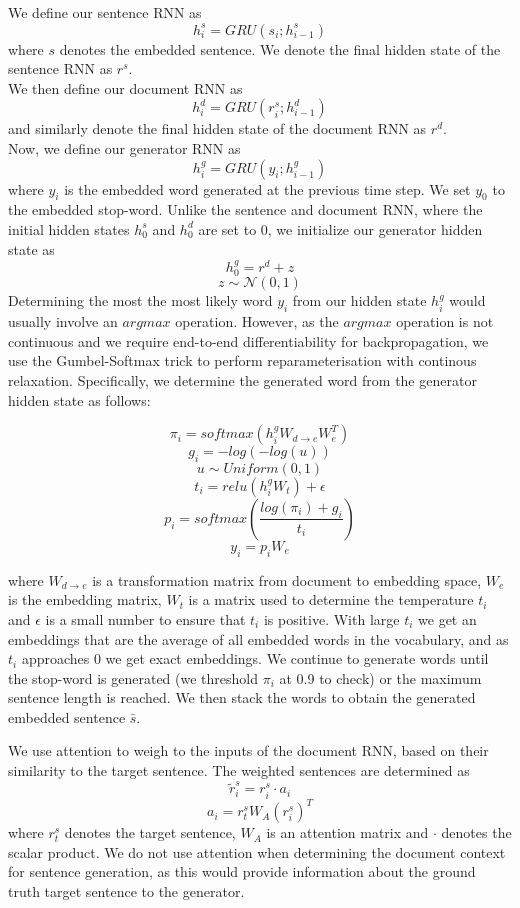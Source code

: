 \documentclass{article}
\begin{document}
We define our sentence RNN as
$$ h^{s}_{i} = GRU(s_{i}; h^{s}_{i-1})$$
where $s$ denotes the embedded sentence. We denote the final hidden state of the sentence RNN as $r^{s}$. \\
We then define our document RNN as
$$ h^{d}_{i} = GRU(r^{s}_{i}; h^{d}_{i-1}) $$
and similarly denote the final hidden state of the document RNN as $r^{d}$. \\
Now, we define our generator RNN as
$$ h^{g}_{i} = GRU(y_{i}; h^{g}_{i-1}) $$
where $y_{i}$ is the embedded word generated at the previous time step. We set $y_{0}$ to the embedded stop-word. Unlike the sentence and document RNN, where the initial hidden states $h^{s}_{0}$ and $h^{d}_{0}$ are set to 0, we initialize our generator hidden state as
$$ h^{g}_{0} = r^{d} + z $$
$$ z \sim \mathcal{N}(0,1) $$
Determining the most the most likely word $y_{i}$ from our hidden state $h^{g}_{i}$ would usually involve an $argmax$ operation. However, as the $argmax$ operation is not continuous and we require end-to-end differentiability for backpropagation, we use the Gumbel-Softmax trick to perform reparameterisation with continous relaxation. Specifically, we determine the generated word from the generator hidden state as follows:

$$ \pi_{i} = softmax(h^{g}_{i}W_{d \rightarrow e}W_{e}^{T})$$
$$ g_{i} = -log(-log(u)) $$
$$ u \sim Uniform(0,1) $$
$$ t_{i} = relu(h^{g}_{i}W_{t}) + \epsilon $$
$$ p_{i} = softmax(\frac{log(\pi_{i}) + g_{i}}{t_{i}}) $$
$$ y_{i} = p_{i}W_{e}$$

where $W_{d \rightarrow e}$ is a transformation matrix from document to embedding space, $W_{e}$ is the embedding matrix, $W_{t}$ is a matrix used to determine the temperature $t_{i}$ and $\epsilon$ is a small number to ensure that $t_{i}$ is positive. With large $t_{i}$ we get an embeddings that are the average of all embedded words in the vocabulary, and as $t_{i}$ approaches 0 we get exact embeddings. We continue to generate words until the stop-word is generated (we threshold $\pi_{i}$ at 0.9 to check) or the maximum sentence length is reached. We then stack the words to obtain the generated embedded sentence $\bar{s}$.

We use attention to weigh to the inputs of the document RNN, based on their similarity to the target sentence. The weighted sentences are determined as
$$ \tilde{r}^{s}_{i} = r^{s}_{i} \cdot a_{i} $$
$$ a_{i} = r^{s}_{t}W_{A}(r^{s}_{i})^{T} $$
where $r^{s}_{t}$ denotes the target sentence, $W_{A}$ is an attention matrix and $\cdot$ denotes the scalar product. We do not use attention when determining the document context for sentence generation, as this would provide information about the ground truth target sentence to the generator.\\ 
\end{document}
